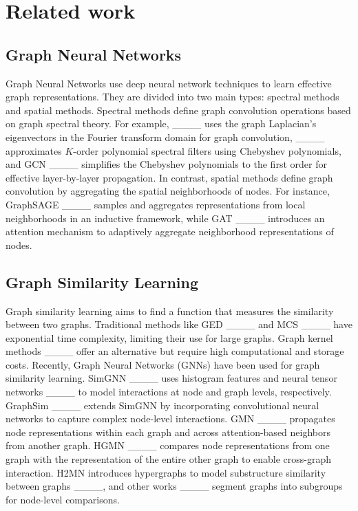 \section{Related work}
\subsection{Graph Neural Networks}
Graph Neural Networks use deep neural network techniques to learn effective graph representations. They are divided into two main types: spectral methods and spatial methods. Spectral methods define graph convolution operations based on graph spectral theory. For example, ____ uses the graph Laplacian's eigenvectors in the Fourier transform domain for graph convolution, ____ approximates $K$-order polynomial spectral filters using Chebyshev polynomials, and GCN ____ simplifies the Chebyshev polynomials to the first order for effective layer-by-layer propagation. In contrast, spatial methods define graph convolution by aggregating the spatial neighborhoods of nodes. For instance, GraphSAGE ____ samples and aggregates representations from local neighborhoods in an inductive framework, while GAT ____ introduces an attention mechanism to adaptively aggregate neighborhood representations of nodes.

\subsection{Graph Similarity Learning}
Graph similarity learning aims to find a function that measures the similarity between two graphs. Traditional methods like GED ____ and MCS ____ have exponential time complexity, limiting their use for large graphs. Graph kernel methods ____ offer an alternative but require high computational and storage costs. Recently, Graph Neural Networks (GNNs) have been used for graph similarity learning. SimGNN ____ uses histogram features and neural tensor networks ____ to model interactions at node and graph levels, respectively. GraphSim ____ extends SimGNN by incorporating convolutional neural networks to capture complex node-level interactions. GMN ____ propagates node representations within each graph and across attention-based neighbors from another graph. HGMN ____ compares node representations from one graph with the representation of the entire other graph to enable cross-graph interaction. H2MN introduces hypergraphs to model substructure similarity between graphs ____, and other works ____ segment graphs into subgroups for node-level comparisons.

